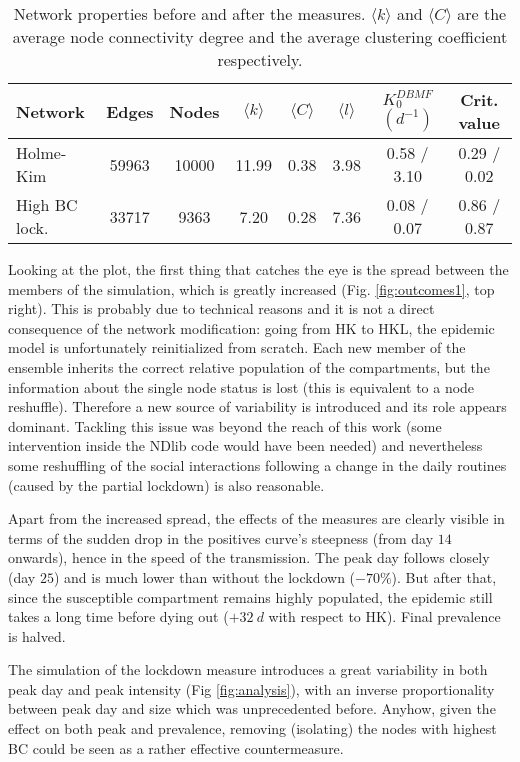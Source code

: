 \documentclass[DIV=12, BCOR=0pt]{scrartcl}  %
\begin{document}
	\begin{table}[h]
		\centering
		\caption{Network properties before and after the measures. $\langle k \rangle$ and $\langle C \rangle$ are the average node connectivity degree and the average clustering coefficient respectively.}
		\label{tab:lock_networks}
		\begin{tabular}{lccccccc}
			\toprule
			Network &  Edges &  Nodes & $\langle k \rangle$ & $\langle C \rangle$ & $\langle l \rangle$ & $K_0^{DBMF}$ $(d^{-1})$ & Crit. value \\
			\midrule
			Holme-Kim 		&  59963 &  10000 & 11.99 &  0.38 &  3.98 &  0.58 / 3.10 &   0.29 / 0.02 \\ 
			High BC lock.	&  33717 &   9363 &  7.20 &  0.28 &  7.36 &  0.08 / 0.07 &   0.86 / 0.87 \\
			
			\bottomrule
		\end{tabular}
	\end{table}
	
	Looking at the plot, the first thing that catches the eye is the spread between the members of the simulation, which is greatly increased (Fig. \ref{fig:outcomes1}, top right). This is probably due to technical reasons and it is not a direct consequence of the network modification: going from HK to HKL, the epidemic model is unfortunately reinitialized from scratch. Each new member of the ensemble inherits the correct relative population of the compartments, but the information about the single node status is lost (this is equivalent to a node reshuffle). Therefore a new source of variability is introduced and its role appears dominant. Tackling this issue was beyond the reach of this work (some intervention inside the NDlib code would have been needed) and nevertheless some reshuffling of the social interactions following a change in the daily routines (caused by the partial lockdown) is also reasonable.
	
	Apart from the increased spread, the effects of the measures are clearly visible in terms of the sudden drop in the positives curve's steepness (from day $14$ onwards), hence in the speed of the transmission. The peak day follows closely (day $25$) and is much lower than without the lockdown ($- 70 \%$). But after that, since the susceptible compartment remains highly populated, the epidemic still takes a long time before dying out ($+ 32 \ d$ with respect to HK). Final prevalence is halved.
	
	The simulation of the lockdown measure introduces a great variability in both peak day and peak intensity (Fig \ref{fig:analysis}), with an inverse proportionality between peak day and size	which was unprecedented before.
	Anyhow, given the effect on both peak and prevalence, removing (isolating) the nodes with highest BC could be seen as a rather effective countermeasure.
 	
\end{document}
